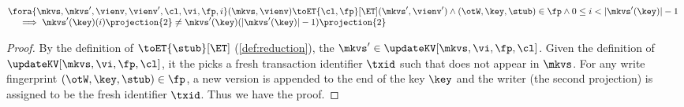 \begin{lemma}
    \label{lem:unique-writer}
    \[
    \begin{array}{@{}l}
        \fora{\mkvs, \mkvs',\vienv,\vienv', \cl, \vi, \fp, i} 
        (\mkvs, \vienv) \toET{\cl, \fp}[\ET] (\mkvs', \vienv')
        \land (\otW, \key, \stub) \in \fp  
        \land 0 \leq i < \lvert \mkvs'(\key) \rvert - 1 \\
        \quad {} \implies \mkvs'(\key)(i)\projection{2} \neq \mkvs'(\key)(\lvert \mkvs'(\key) \rvert - 1)\projection{2}
    \end{array}
    \]
\end{lemma}
\begin{proof}
    By the definition of \( \toET{\stub}[\ET] \) (\cref{def:reduction}), the \( \mkvs' \in \updateKV[\mkvs, \vi, \fp, \cl] \).
    Given the definition of \( \updateKV[\mkvs, \vi, \fp, \cl]\), it the picks a fresh transaction identifier \( \txid \) such that does not appear in \( \mkvs \).
    For any write fingerprint \( (\otW, \key, \stub) \in \fp \), a new version is appended to the end of the key \( \key \) and the writer (the second projection) is assigned to be the fresh identifier \( \txid \).
    Thus we have the proof.
\end{proof}

